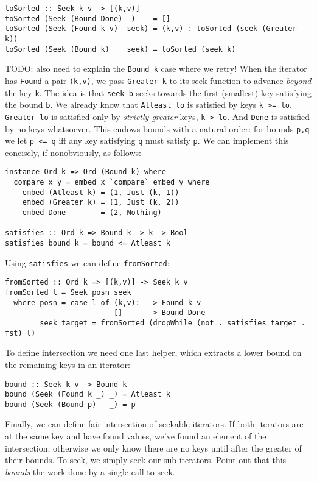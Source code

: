\documentclass[acmsmall,screen,review,anonymous,dvipsnames,svgnames]{acmart}
\newcommand\hask[1]{\texttt{#1}}
\newcommand\ttt\texttt
\newcommand\todo[1]{{\color{Orange}#1}}
\renewcommand\todo[1]{{\color{IndianRed}#1}}
\begin{document}
\begin{verbatim}
toSorted :: Seek k v -> [(k,v)]
toSorted (Seek (Bound Done) _)    = []
toSorted (Seek (Found k v)  seek) = (k,v) : toSorted (seek (Greater k))
toSorted (Seek (Bound k)    seek) = toSorted (seek k)
\end{verbatim}

\noindent
\todo{TODO: also need to explain the \hask{Bound k} case where we retry!}
When the iterator has \hask{Found} a pair \ttt{(k,v)}, we pass \hask{Greater k} to its seek function to advance \emph{beyond} the key \ttt{k}.
The idea is that \ttt{seek b} seeks towards the first (smallest) key satisfying the bound \ttt{b}.
We already know that \hask{Atleast lo} is satisfied by keys \ttt{k >= lo}.
\hask{Greater lo} is satisfied only by \emph{strictly greater} keys, \ttt{k > lo}.
And \hask{Done} is satisfied by no keys whatsoever.
This endows bounds with a natural order: for bounds \ttt{p,q} we let \ttt{p <= q} iff any key satisfying \ttt{q} must satisfy \ttt{p}.
We can implement this concisely, if nonobviously, as follows:

\begin{verbatim}
instance Ord k => Ord (Bound k) where
  compare x y = embed x `compare` embed y where
    embed (Atleast k) = (1, Just (k, 1))
    embed (Greater k) = (1, Just (k, 2))
    embed Done        = (2, Nothing)

satisfies :: Ord k => Bound k -> k -> Bool
satisfies bound k = bound <= Atleast k
\end{verbatim}

\noindent
Using \ttt{satisfies} we can define \ttt{fromSorted}:

\begin{verbatim}
fromSorted :: Ord k => [(k,v)] -> Seek k v
fromSorted l = Seek posn seek
  where posn = case l of (k,v):_ -> Found k v
                         []      -> Bound Done
        seek target = fromSorted (dropWhile (not . satisfies target . fst) l)
\end{verbatim}

\noindent
To define intersection we need one last helper, which extracts a lower bound on the remaining keys in an iterator:

\begin{verbatim}
bound :: Seek k v -> Bound k
bound (Seek (Found k _) _) = Atleast k
bound (Seek (Bound p)   _) = p
\end{verbatim}

\noindent
Finally, we can define fair intersection of seekable iterators.
If both iterators are at the same key and have found values, we've found an element of the intersection; otherwise we only know there are no keys until after the greater of their bounds.
To seek, we simply seek our sub-iterators.
\todo{Point out that this \emph{bounds} the work done by a single call to seek.}
\end{document}
